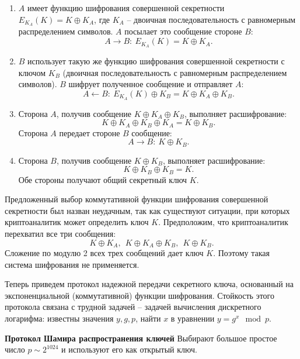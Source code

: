 \begin{enumerate}
    \item $A$ имеет функцию шифрования совершенной секретности $E_{K_A}(K) = K \oplus K_A$, где $K_A$ -- двоичная последовательность с равномерным распределением символов. $A$ посылает это сообщение стороне $B$:
            \[ A \rightarrow B: ~ E_{K_A}(K) = K \oplus K_A. \]
    \item $B$ использует такую же функцию шифрования совершенной секретности с ключом $K_B$ (двоичная последовательность с равномерным распределением символов). $B$ шифрует полученное сообщение и отправляет $A$:
            \[ A \leftarrow B: ~ E_{K_A}(K) \oplus K_B = K \oplus K_A \oplus K_B. \]
    \item Сторона $A$, получив сообщение $K \oplus K_A \oplus K_B$, выполняет расшифрование:
            \[ K \oplus K_A \oplus K_B \oplus K_A = K \oplus K_B. \]
        Сторона $A$ передает стороне $B$ сообщение:
            \[ A \rightarrow B: ~ K \oplus K_B. \]
    \item Сторона $B$, получив сообщение $K \oplus K_B$, выполняет расшифрование:
            \[ K \oplus K_B \oplus K_B = K. \]
        Обе стороны получают общий секретный ключ $K$.
\end{enumerate}

Предложенный выбор коммутативной функции шифрования совершенной секретности был назван неудачным, так как существуют ситуации, при которых криптоаналитик может определить ключ $K$. Предположим, что криптоаналитик перехватил все три сообщения:
    \[ K \oplus K_A, ~~ K \oplus K_A \oplus K_B, ~~ K \oplus K_B. \]
Сложение по модулю 2 всех трех сообщений дает ключ $K$. Поэтому такая система шифрования не применяется.

Теперь приведем протокол надежной  передачи секретного ключа, основанный на экспоненциальной (коммутативной) функции шифрования. Стойкость этого протокола связана с трудной задачей -- задачей вычисления дискретного логарифма: известны значения $y, g, p$, найти $x$ в уравнении $y = g^x \mod p$.

\textbf{Протокол Шамира распространения ключей}
Выбирают большое простое число $p\sim 2^{1024}$ и используют его как открытый ключ.

